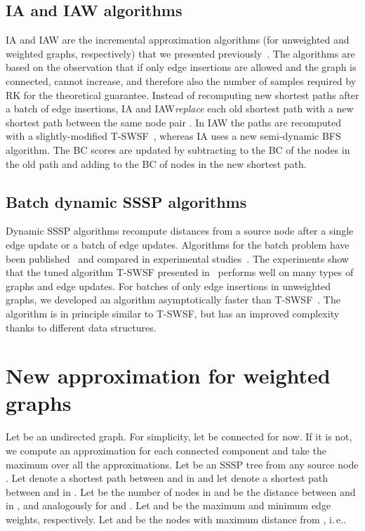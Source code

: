 \documentclass[english]{llncs}
\newcommand{\ie}{i.\,e.\xspace}
\newcommand{\vd}{\xspace}
\newcommand{\rk}{\textsf{RK}\xspace}
\newcommand{\ia}{\textsf{IA}\xspace}
\newcommand{\iaw}{\textsf{IAW}\xspace}
\begin{document}
\subsection{\textsf{IA} and \textsf{IAW} algorithms}
\label{sec:bms}
\ia and \iaw are the incremental approximation algorithms (for unweighted and weighted graphs, respectively) that we presented previously~\cite{DBLP:conf/alenex/BergaminiMS15}. The algorithms are based on the observation that if only edge insertions are allowed and the graph is connected, \vd cannot increase, and therefore also the number  of samples required by \rk for the theoretical guarantee. Instead of recomputing  new shortest paths after a batch of edge insertions, \ia and \iaw \textit{replace} each old shortest path  with a new shortest path between the same node pair . In \iaw the paths are recomputed with a slightly-modified \textsf{T-SWSF}~\cite{DBLP:conf/wea/BauerW09}, whereas \ia uses a new semi-dynamic BFS algorithm.
The BC scores are updated by subtracting  to the BC of the nodes in the old path and adding  to the BC of nodes in the new shortest path.

\subsection {Batch dynamic SSSP algorithms}
\label{sssp_update}
Dynamic SSSP algorithms recompute distances from a source node after a single edge update or a batch of edge updates.
Algorithms for the batch problem have been published~\cite{Ramalingam92anincremental,Frigioni_semi-dynamicalgorithms,DBLP:conf/wea/BauerW09} and compared in experimental studies~\cite{DBLP:conf/wea/BauerW09,DBLP:conf/wea/DAndreaDFLP14}.
The experiments show that the tuned algorithm \textsf{T-SWSF} presented in~\cite{DBLP:conf/wea/BauerW09} performs well on many types of graphs and edge updates. For batches of only edge insertions in unweighted graphs, we developed an algorithm asymptotically faster than \textsf{T-SWSF}~\cite{DBLP:conf/alenex/BergaminiMS15}. The algorithm is in principle similar to \textsf{T-SWSF}, but has an improved complexity thanks to different data structures.


\section{New \vd approximation for weighted graphs}
\label{sec:new_vd_approx}
Let  be an undirected graph. For simplicity, let  be connected for now. If it is not, we compute an approximation for each connected component and take the maximum over all the approximations. Let  be an SSSP tree from any source node . Let  denote a shortest path between  and  in  and let  denote a shortest path between  and  in . Let  be the number of nodes in  and  be the distance between  and  in , and analogously for  and . Let  and   be the maximum and minimum edge weights, respectively. Let  and  be the nodes with maximum distance from , \ie . 
\end{document}
